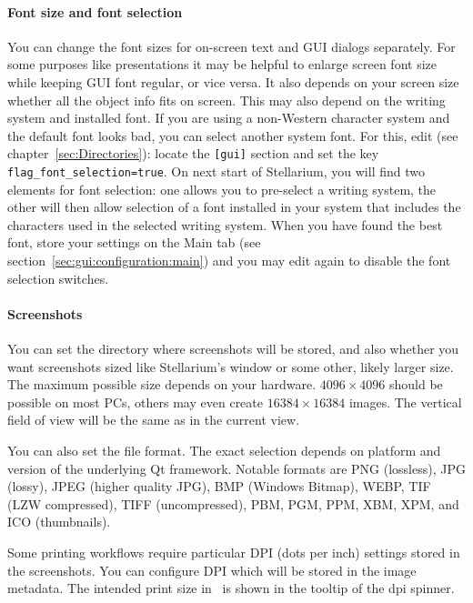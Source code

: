 \paragraph{Font size and font selection}  You can change the font sizes for on-screen
text and GUI dialogs separately.  For some purposes like presentations
it may be helpful to enlarge screen font size while keeping GUI font
regular, or vice versa.  It also depends on your screen size whether
all the object info fits on screen. This may also depend on the
writing system and installed font. If you are using a non-Western
character system and the default font looks bad, you can select
another system font. For this, edit  (see
chapter~\ref{sec:Directories}): locate the \texttt{[gui]} section and
set the key \texttt{flag\_font\_selection=true}. On next start of
Stellarium, you will find two elements for font selection: one allows
you to pre-select a writing system, the other will then allow
selection of a font installed in your system that includes the
characters used in the selected writing system. When you have found
the best font, store your settings on the Main tab (see
section~\ref{sec:gui:configuration:main}) and you may edit
 again to disable the font selection switches.

\paragraph{Screenshots} You can set the directory where screenshots
will be stored, and  also whether you want
screenshots sized like Stellarium's window or some other, likely
larger size. The maximum possible size depends on your
hardware. $4096\times4096$ should be possible on most PCs, others may
even create $16384\times16384$ images. The vertical field of view will be the same as in the current view.

You can also set  the file format. The exact selection depends on
platform and version of the underlying Qt framework. Notable formats are PNG (lossless), JPG (lossy),
JPEG (higher quality JPG), BMP (Windows Bitmap), WEBP, TIF (LZW compressed), TIFF (uncompressed),
PBM, PGM, PPM, XBM, XPM, and ICO (thumbnails).

Some printing workflows require particular DPI (dots per inch)
settings stored in the screenshots.  You can
configure DPI which will be stored in the image metadata. The intended
print size in \mm\ is shown in the tooltip of the dpi spinner.


